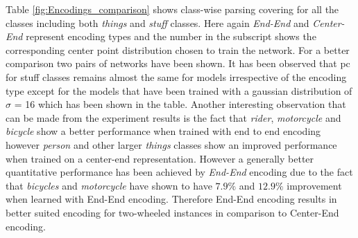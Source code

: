 Table \ref{fig:Encodings_comparison} shows class-wise parsing covering for all the classes including both \textit{things} and \textit{stuff} classes. Here again \textit{End-End} and \textit{Center-End} represent encoding types and the number in the subscript shows the corresponding center point distribution chosen to train the network. For a better comparison two pairs of networks have been shown. It has been observed that \gls{pc} for stuff classes remains almost the same for models irrespective of the encoding type except for the models that have been trained with a gaussian distribution of $\sigma$ = 16 which has been shown in the table. Another interesting observation that can be made from the experiment results is the fact that \textit{rider}, \textit{motorcycle} and \textit{bicycle} show a better performance when trained with end to end encoding however \textit{person} and other larger \textit{things} classes show an improved performance when trained on a center-end representation. However a generally better quantitative performance has been achieved by \textit{End-End} encoding due to the fact that \textit{bicycles} and \textit{motorcycle} have shown to have $7.9\%$ and $12.9\%$  improvement when learned with End-End encoding.  Therefore End-End encoding results in better suited encoding for two-wheeled instances in comparison to Center-End encoding.


